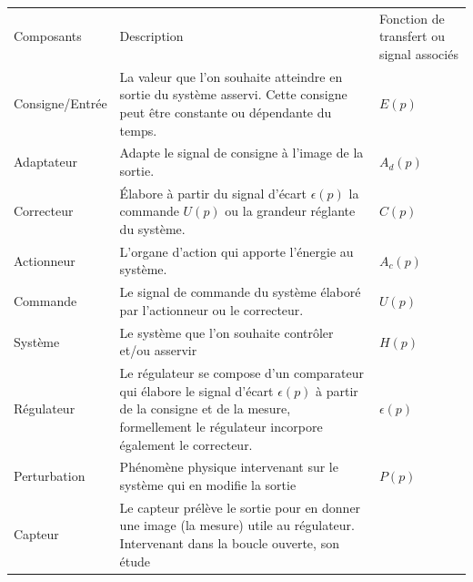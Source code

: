 \begin{table}[!h]
\begin{center}
    \begin{tabular}{M{3cm}M{8cm}M{4cm}}
        \hhline{===}
Composants      & Description & Fonction de transfert ou signal associés\\[0em]
        \hhline{===}
Consigne/Entrée & La valeur que l'on souhaite atteindre en sortie 
                  du système asservi. Cette consigne peut être constante 
                  ou dépendante du temps. 
                & $E(p)$                                                \\[0em]
        \hline
Adaptateur      & Adapte le signal de consigne à l'image de la sortie.
                & $A_d(p)$                                              \\[0em]
        \hline
Correcteur      & \'Elabore à partir du signal d'écart $\epsilon(p)$ 
                          la commande $U(p)$ ou la grandeur réglante du système.
                & $C(p)$                                                \\[0em]
        \hline
Actionneur      & L'organe d'action qui apporte l'énergie au système.
                & $A_c(p)$                                              \\[0em]
        \hline
Commande        & Le signal de commande du système élaboré par l'actionneur 
		                  ou le correcteur.
                & $U(p)$                                                \\[0em]
        \hline
Système         & Le système que l'on souhaite contrôler et/ou asservir
                & $H(p)$                                                \\[0em]
        \hline
Régulateur      & Le régulateur se compose d'un comparateur qui élabore le 
                  signal d'écart $\epsilon(p)$ à partir de la consigne et de 
                  la mesure, formellement le régulateur incorpore 
                  également le correcteur.
                & $\epsilon(p)$                                         \\[0em]
        \hline
Perturbation    & Phénomène physique intervenant sur le système qui 
                  en modifie la sortie
                & $P(p)$                                                \\[0em]
        \hline
Capteur         &  Le capteur prélève le sortie pour en donner une 
                   image (la mesure) utile au régulateur. 
                   Intervenant dans la boucle ouverte, son étude 

\end{tabular}
\end{center}
\end{table}
